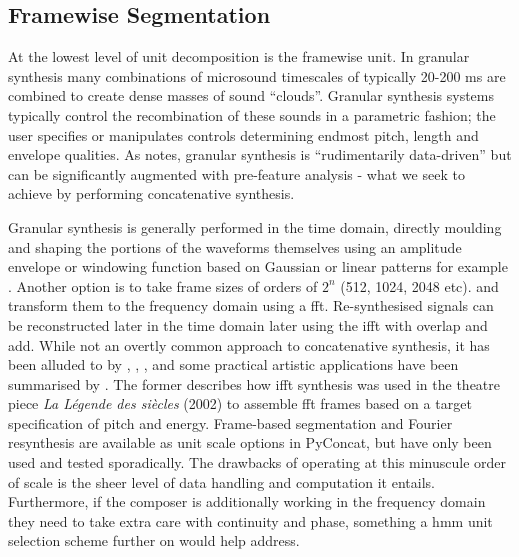 \subsection{Framewise Segmentation}

At the lowest level of unit decomposition is the framewise unit. In granular synthesis many combinations of microsound timescales of typically 20-200 ms are combined to create dense masses of sound “clouds”. Granular synthesis systems typically control the recombination of these sounds in a parametric fashion; the user specifies or manipulates controls determining endmost pitch, length and envelope qualities. As \cite{Schwarz2003} notes, granular synthesis is “rudimentarily data-driven” but can be significantly augmented with pre-feature analysis - what we seek to achieve by performing concatenative synthesis. 

Granular synthesis is generally performed in the time domain, directly moulding and shaping the portions of the waveforms themselves using an amplitude envelope or windowing function based on Gaussian or linear patterns for example \citep{Roads1996, Roads2004} . Another option is to take frame sizes of orders of $2^n$ (512, 1024, 2048 etc). and transform them to the frequency domain using a \acrfull{fft}. Re-synthesised signals can be reconstructed later in the time domain later using the \acrfull{ifft} with overlap and add. While not an overtly common approach to concatenative synthesis, it has been alluded to by \cite{Kobayashi}, \cite{Puckette2004}, \cite{An2012}, and some practical artistic applications have been summarised by \cite{Schwarz2006b}. The former describes how \acrshort{ifft} synthesis was used in the theatre piece \textit{La Légende des siècles} (2002) to assemble \acrshort{fft} frames based on a target specification of pitch and energy. Frame-based segmentation and Fourier resynthesis are available as unit scale options in PyConcat, but have only been used and tested sporadically. The drawbacks of operating at this minuscule order of scale is the sheer level of data handling and computation it entails. Furthermore, if the composer is additionally working in the frequency domain they need to take extra care with continuity and phase, something a \acrshort{hmm} unit selection scheme further on would help address. 


